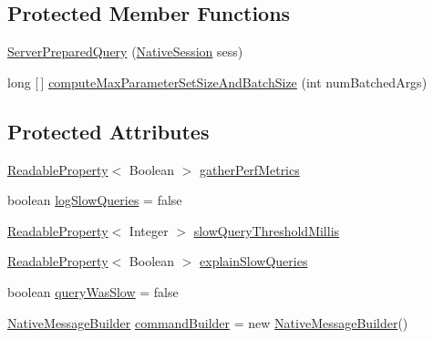 \subsection*{Protected Member Functions}
\begin{DoxyCompactItemize}
\item 
\mbox{\hyperlink{classcom_1_1mysql_1_1cj_1_1_server_prepared_query_a69d79ba4465bd1b0c57ba05a75009f9b}{Server\+Prepared\+Query}} (\mbox{\hyperlink{classcom_1_1mysql_1_1cj_1_1_native_session}{Native\+Session}} sess)
\item 
long \mbox{[}$\,$\mbox{]} \mbox{\hyperlink{classcom_1_1mysql_1_1cj_1_1_server_prepared_query_a2b7f3b7ca471b130821b1a3f85f9743e}{compute\+Max\+Parameter\+Set\+Size\+And\+Batch\+Size}} (int num\+Batched\+Args)
\end{DoxyCompactItemize}
\subsection*{Protected Attributes}
\begin{DoxyCompactItemize}
\item 
\mbox{\hyperlink{interfacecom_1_1mysql_1_1cj_1_1conf_1_1_readable_property}{Readable\+Property}}$<$ Boolean $>$ \mbox{\hyperlink{classcom_1_1mysql_1_1cj_1_1_server_prepared_query_a9e268a4826073f56542957cb6f2c749d}{gather\+Perf\+Metrics}}
\item 
boolean \mbox{\hyperlink{classcom_1_1mysql_1_1cj_1_1_server_prepared_query_adf3ea011f33511e148ee0849fc83422c}{log\+Slow\+Queries}} = false
\item 
\mbox{\hyperlink{interfacecom_1_1mysql_1_1cj_1_1conf_1_1_readable_property}{Readable\+Property}}$<$ Integer $>$ \mbox{\hyperlink{classcom_1_1mysql_1_1cj_1_1_server_prepared_query_ac2943f0cbf8a0e6cb647c80cdbba9646}{slow\+Query\+Threshold\+Millis}}
\item 
\mbox{\hyperlink{interfacecom_1_1mysql_1_1cj_1_1conf_1_1_readable_property}{Readable\+Property}}$<$ Boolean $>$ \mbox{\hyperlink{classcom_1_1mysql_1_1cj_1_1_server_prepared_query_a1eab4c499551a778cb12d0c473c8b815}{explain\+Slow\+Queries}}
\item 
boolean \mbox{\hyperlink{classcom_1_1mysql_1_1cj_1_1_server_prepared_query_a2c9acc7f07f7d96a7620dc19e6dff0e9}{query\+Was\+Slow}} = false
\item 
\mbox{\hyperlink{classcom_1_1mysql_1_1cj_1_1protocol_1_1a_1_1_native_message_builder}{Native\+Message\+Builder}} \mbox{\hyperlink{classcom_1_1mysql_1_1cj_1_1_server_prepared_query_adc296978c2cf7abe01b5df5708006dcc}{command\+Builder}} = new \mbox{\hyperlink{classcom_1_1mysql_1_1cj_1_1protocol_1_1a_1_1_native_message_builder}{Native\+Message\+Builder}}()
\end{DoxyCompactItemize}


